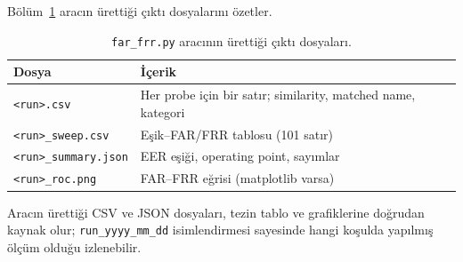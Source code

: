 Bölüm~\ref{tab:harness-cikti} aracın ürettiği çıktı dosyalarını özetler.

\begin{table}[h!]
\centering
\caption{\texttt{far\_frr.py} aracının ürettiği çıktı dosyaları.}
\label{tab:harness-cikti}
\small
\begin{tabular}{l l}
\toprule
\textbf{Dosya} & \textbf{İçerik}\\
\midrule
\texttt{<run>.csv}            & Her probe için bir satır; similarity, matched name, kategori\\
\texttt{<run>\_sweep.csv}     & Eşik--FAR/FRR tablosu (101 satır)\\
\texttt{<run>\_summary.json}  & EER eşiği, operating point, sayımlar\\
\texttt{<run>\_roc.png}       & FAR--FRR eğrisi (matplotlib varsa)\\
\bottomrule
\end{tabular}
\end{table}

Aracın ürettiği CSV ve JSON dosyaları, tezin tablo ve grafiklerine
doğrudan kaynak olur; \texttt{run\_yyyy\_mm\_dd} isimlendirmesi sayesinde
hangi koşulda yapılmış ölçüm olduğu izlenebilir.
